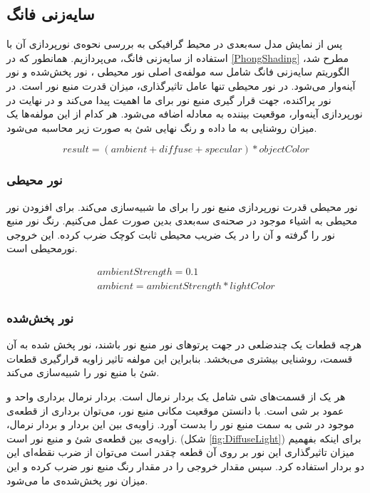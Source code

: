 \subsection{سایه‌زنی فانگ}
پس از نمایش مدل سه‌‌بعدی در محیط گرافیکی به 
بررسی نحوه‌ی نورپردازی آن با استفاده از سایه‌‌زنی فانگ، می‌پردازیم.
همانطور که در 
\ref{PhongShading}
مطرح شد، الگوریتم سایه‌زنی فانگ شامل سه مولفه‌ی اصلی 
نور محیطی
، نور پخش‌شده
و نور آینه‌وار
می‌شود.
در نور محیطی تنها عامل تاثیرگذاری، میزان قدرت منبع نور است.
در نور پراکنده، جهت قرار گیری منبع نور برای ما اهمیت پیدا می‌کند و در نهایت 
در نورپردازی آینه‌وار، موقعیت بیننده به معادله اضافه می‌شود.
هر کدام از این مولفه‌ها یک میزان روشنایی به ما داده و 
رنگ نهایی شئ به صورت زیر محاسبه می‌شود.

\[ result = (ambient + diffuse + specular) * objectColor \]

\subsubsection{نور محیطی}
نور محیطی قدرت نورپردازی منبع نور را برای ما شبیه‌سازی می‌کند.
برای افزودن نور محیطی به اشیاء موجود در صحنه‌ی سه‌بعدی بدین صورت عمل 
می‌کنیم. رنگ نور منبع نور را گرفته و آن را در یک ضریب محیطی 
ثابت کوچک ضرب کرده. این خروجی نورمحیطی
است.

\begin{gather*}
	ambientStrength = 0.1 \\
	ambient = ambientStrength * lightColor
\end{gather*}


\subsubsection{نور پخش‌شده}

هرچه قطعات یک چندضلعی در جهت پرتو‌های نور منبع نور باشند، نور پخش شده 
به آن قسمت، روشنایی بیشتری می‌بخشد.
بنابراین این مولفه تاثیر زاویه قرارگیری قطعات شئ با منبع نور را شبیه‌سازی می‌کند.

هر یک از قسمت‌های شی شامل یک بردار نرمال است. بردار نرمال برداری واحد و عمود بر شی است.
با دانستن موقعیت مکانی منبع نور، می‌‌توان برداری از قطعه‌ی موجود در شی 
به سمت منبع نور را بدست آورد.
زاویه‌ی بین این بردار و بردار نرمال، زاویه‌ی بین قطعه‌ی شئ و منبع نور است.
(شکل \ref{fig:DiffuseLight})
برای اینکه بفهمیم میزان تاثیرگذاری این نور بر روی آن قطعه چقدر است می‌توان
از ضرب نقطه‌ای 
این دو بردار استفاده کرد.
سپس مقدار خروجی را در مقدار رنگ منبع نور ضرب کرده و این میزان نور پخش‌شده‌ی 
ما می‌شود.



